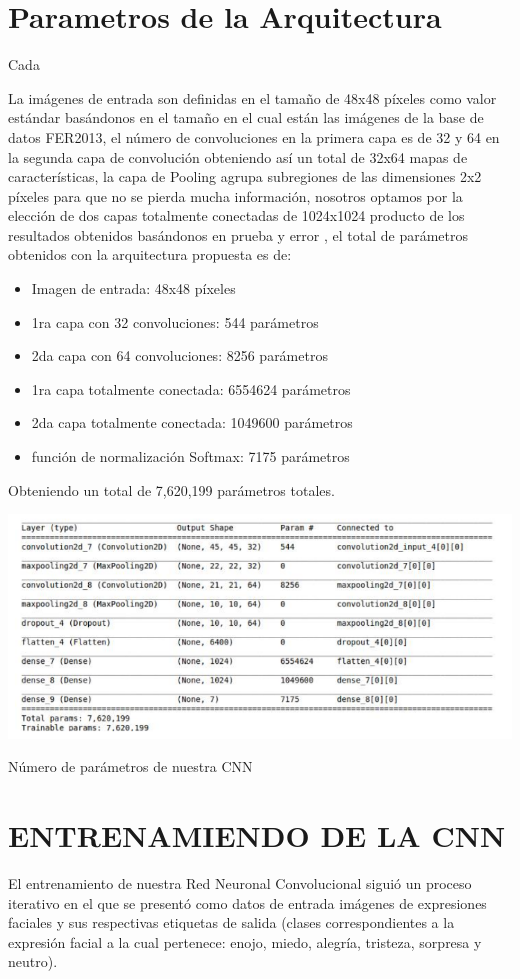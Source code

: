 \section{Parametros de la Arquitectura}
Cada 


La imágenes de entrada son definidas en el tamaño de 48x48 píxeles como valor
estándar basándonos en el tamaño en el cual están las imágenes de la base de datos
FER2013, el número de convoluciones en la primera capa es de 32 y 64 en la segunda
capa de convolución obteniendo así un total de 32x64 mapas de características, la capa
de Pooling agrupa subregiones de las dimensiones 2x2 píxeles para que no se pierda
mucha información, nosotros optamos por la elección de dos capas totalmente conectadas
de 1024x1024 producto de los resultados obtenidos basándonos en prueba y error , el total
de parámetros obtenidos con la arquitectura propuesta es de:

\begin{itemize}
\item Imagen de entrada: 48x48 píxeles
\item 1ra capa con 32 convoluciones: 544 parámetros
\item 2da capa con 64 convoluciones: 8256 parámetros
\item 1ra capa totalmente conectada: 6554624 parámetros
\item 2da capa totalmente conectada: 1049600 parámetros
\item función de normalización Softmax: 7175 parámetros
\end{itemize}
Obteniendo un total de 7,620,199 parámetros totales.

\begin{table}[H]
    \centering
    \includegraphics[width=140mm]{./Imagenes/parametros.png} 
    \caption{Número de parámetros de nuestra CNN}
    \label{tab:parametros}
\end{table}

	
\section{ENTRENAMIENDO DE LA CNN}
El entrenamiento de nuestra Red Neuronal Convolucional siguió un proceso
iterativo en el que se presentó como datos de entrada imágenes de expresiones faciales y
sus respectivas etiquetas de salida (clases correspondientes a la expresión facial a la cual
pertenece: enojo, miedo, alegría, tristeza, sorpresa y neutro).

